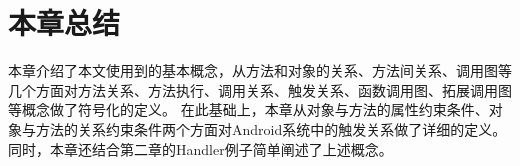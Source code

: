 \section{本章总结}

本章介绍了本文使用到的基本概念，从方法和对象的关系、方法间关系、调用图等几个方面对方法关系、方法执行、调用关系、触发关系、函数调用图、拓展调用图等概念做了符号化的定义。
在此基础上，本章从对象与方法的属性约束条件、对象与方法的关系约束条件两个方面对Android系统中的触发关系做了详细的定义。
同时，本章还结合第二章的Handler例子简单阐述了上述概念。
